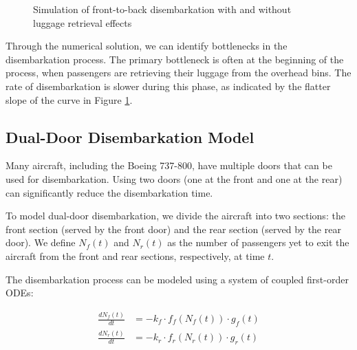 \documentclass[12pt,a4paper]{article}
\begin{document}
\begin{figure}[H]
\centering
{}
\caption{Simulation of front-to-back disembarkation with and without luggage retrieval effects}
\label{fig:front_to_back}
\end{figure}

Through the numerical solution, we can identify bottlenecks in the disembarkation process. The primary bottleneck is often at the beginning of the process, when passengers are retrieving their luggage from the overhead bins. The rate of disembarkation is slower during this phase, as indicated by the flatter slope of the curve in Figure \ref{fig:front_to_back}.

\subsection{Dual-Door Disembarkation Model}

Many aircraft, including the Boeing 737-800, have multiple doors that can be used for disembarkation. Using two doors (one at the front and one at the rear) can significantly reduce the disembarkation time.

To model dual-door disembarkation, we divide the aircraft into two sections: the front section (served by the front door) and the rear section (served by the rear door). We define $N_f(t)$ and $N_r(t)$ as the number of passengers yet to exit the aircraft from the front and rear sections, respectively, at time $t$.

The disembarkation process can be modeled using a system of coupled first-order ODEs:

\begin{align}
\frac{dN_f(t)}{dt} &= -k_f \cdot f_f(N_f(t)) \cdot g_f(t) \\
\frac{dN_r(t)}{dt} &= -k_r \cdot f_r(N_r(t)) \cdot g_r(t)
\label{eq:dual_door}
\end{align}
\end{document}
